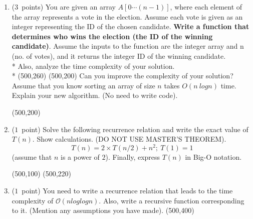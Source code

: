 \documentclass[14pt]{article}
\begin{document}
\begin{enumerate}[label=\alph*)]
    \item ($3$\ points)
    You are given an array $A[0 \cdots (n-1)]$, where each element of the array represents a vote in the election. Assume each vote is given as an integer representing the ID of the chosen candidate. \textbf{Write a function that determines who wins the election (the ID of the winning candidate)}. Assume the inputs to the function are the integer array and n (no. of votes), and it returns the integer ID of the winning candidate. \\*
    Also, analyze the time complexity of your solution. \\*
    \framebox(500,260){}
    \framebox(500,200){}
    Can you improve the complexity of your solution? Assume that you know sorting an array of size $n$ takes $O(n\ logn)$ time. Explain your new algorithm. (No need to write code).
    
    \framebox(500,200){}
    
    \item ($1$\ point)
    Solve the following recurrence relation and write the exact value of $T(n).$ Show calculations. (DO NOT USE MASTER'S THEOREM).
    \[T(n) = 2 \times T(n/2) + n^2; \ T(1) = 1 \]
    (assume that $n$ is a power of $2$). Finally, express $T(n)$ in Big-O notation.
    
    \framebox(500,100){}
    \framebox(500,220){}
    
    \item ($1$\ point)
    You need to write a recurrence relation that leads to the time complexity of $\mathcal{O}(nloglogn)$. Also, write a recursive function corresponding to it. (Mention any assumptions you have made).
    \framebox(500,400){}
\end{enumerate}
\end{document}
